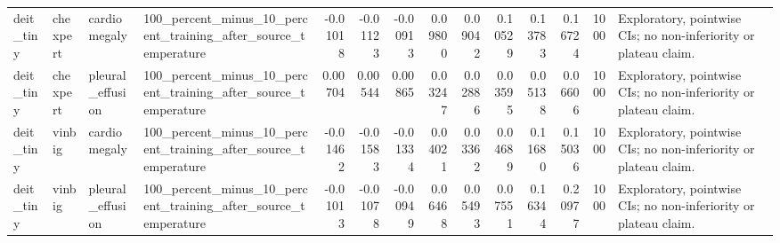 \begin{tabular}{llllrrrrrrrrrl}
deit\_tiny & chexpert & cardiomegaly & 100\_percent\_minus\_10\_percent\_training\_after\_source\_temperature & -0.01018 & -0.01123 & -0.00913 & 0.09800 & 0.09042 & 0.10529 & 0.13783 & 0.16724 & 1000 & Exploratory, pointwise CIs; no non-inferiority or plateau claim. \\
deit\_tiny & chexpert & pleural\_effusion & 100\_percent\_minus\_10\_percent\_training\_after\_source\_temperature & 0.00704 & 0.00544 & 0.00865 & 0.03247 & 0.02886 & 0.03595 & 0.05138 & 0.06606 & 1000 & Exploratory, pointwise CIs; no non-inferiority or plateau claim. \\
deit\_tiny & vinbig & cardiomegaly & 100\_percent\_minus\_10\_percent\_training\_after\_source\_temperature & -0.01462 & -0.01583 & -0.01334 & 0.04021 & 0.03362 & 0.04689 & 0.11680 & 0.15036 & 1000 & Exploratory, pointwise CIs; no non-inferiority or plateau claim. \\
deit\_tiny & vinbig & pleural\_effusion & 100\_percent\_minus\_10\_percent\_training\_after\_source\_temperature & -0.01013 & -0.01078 & -0.00949 & 0.06468 & 0.05493 & 0.07551 & 0.16344 & 0.20977 & 1000 & Exploratory, pointwise CIs; no non-inferiority or plateau claim. \\
\bottomrule
\end{tabular}
